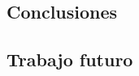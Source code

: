 \documentclass[11pt,a4paper,table]{beamer}
\begin{document}
		\subsection{Conclusiones}
			
		\subsection{Trabajo futuro}
						
%			
%			
%			
%				
%			
%			
%			
\end{document}
